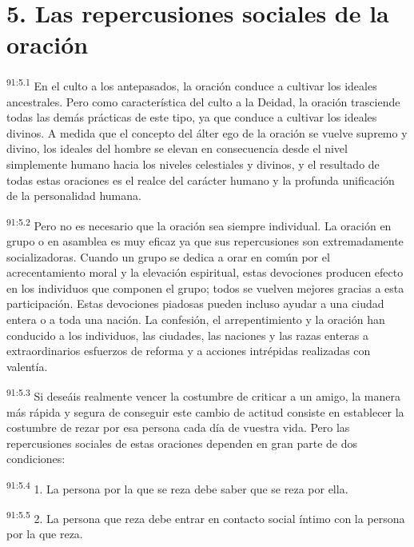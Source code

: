 \section*{5. Las repercusiones sociales de la oración}
\par
\textsuperscript{91:5.1} En el culto a los antepasados, la oración conduce a cultivar los ideales ancestrales. Pero como característica del culto a la Deidad, la oración trasciende todas las demás prácticas de este tipo, ya que conduce a cultivar los ideales divinos. A medida que el concepto del álter ego de la oración se vuelve supremo y divino, los ideales del hombre se elevan en consecuencia desde el nivel simplemente humano hacia los niveles celestiales y divinos, y el resultado de todas estas oraciones es el realce del carácter humano y la profunda unificación de la personalidad humana.

\par
\textsuperscript{91:5.2} Pero no es necesario que la oración sea siempre individual. La oración en grupo o en asamblea es muy eficaz ya que sus repercusiones son extremadamente socializadoras. Cuando un grupo se dedica a orar en común por el acrecentamiento moral y la elevación espiritual, estas devociones producen efecto en los individuos que componen el grupo; todos se vuelven mejores gracias a esta participación. Estas devociones piadosas pueden incluso ayudar a una ciudad entera o a toda una nación. La confesión, el arrepentimiento y la oración han conducido a los individuos, las ciudades, las naciones y las razas enteras a extraordinarios esfuerzos de reforma y a acciones intrépidas realizadas con valentía.

\par
\textsuperscript{91:5.3} Si deseáis realmente vencer la costumbre de criticar a un amigo, la manera más rápida y segura de conseguir este cambio de actitud consiste en establecer la costumbre de rezar por esa persona cada día de vuestra vida. Pero las repercusiones sociales de estas oraciones dependen en gran parte de dos condiciones:

\par
\textsuperscript{91:5.4} 1. La persona por la que se reza debe saber que se reza por ella.

\par
\textsuperscript{91:5.5} 2. La persona que reza debe entrar en contacto social íntimo con la persona por la que reza.

